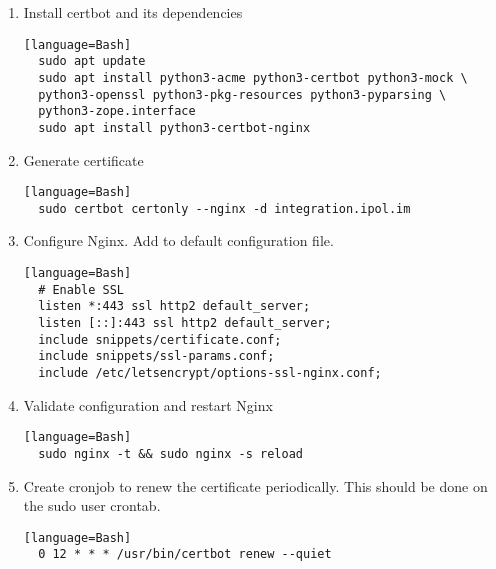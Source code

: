 \documentclass[a4paper,12pt]{article}
\begin{document}
\begin{enumerate}
  \item Install certbot and its dependencies
  \begin{verbatim}[language=Bash]
  sudo apt update
  sudo apt install python3-acme python3-certbot python3-mock \
  python3-openssl python3-pkg-resources python3-pyparsing \
  python3-zope.interface
  sudo apt install python3-certbot-nginx
  \end{verbatim}
  \item Generate certificate
  \begin{verbatim}[language=Bash]
  sudo certbot certonly --nginx -d integration.ipol.im
  \end{verbatim}
  \item Configure Nginx. Add to default configuration file.
  \begin{verbatim}[language=Bash]
  # Enable SSL
  listen *:443 ssl http2 default_server;
  listen [::]:443 ssl http2 default_server;
  include snippets/certificate.conf;
  include snippets/ssl-params.conf;
  include /etc/letsencrypt/options-ssl-nginx.conf;
  \end{verbatim}
  \item Validate configuration and restart Nginx
  \begin{verbatim}[language=Bash]
  sudo nginx -t && sudo nginx -s reload
  \end{verbatim}
  \item Create cronjob to renew the certificate periodically. This should be done on the sudo user crontab.
  \begin{verbatim}[language=Bash]
  0 12 * * * /usr/bin/certbot renew --quiet
  \end{verbatim}

\end{enumerate}
\end{document}
